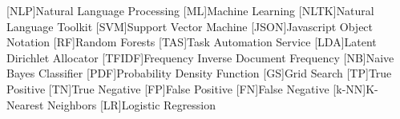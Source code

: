 \documentclass[a4paper,11pt,svgnames]{book}
\begin{document}
	[NLP]{Natural Language Processing}
	[ML]{Machine Learning}
	[NLTK]{Natural Language Toolkit}
	[SVM]{Support Vector Machine}
	[JSON]{Javascript Object Notation}
	[RF]{Random Forests}
	[TAS]{Task Automation Service}
	[LDA]{Latent Dirichlet Allocator}
	[TFIDF]{Frequency Inverse Document Frequency}
	[NB]{Naive Bayes Classifier}
	[PDF]{Probability Density Function}
	[GS]{Grid Search}
	[TP]{True Positive}
	[TN]{True Negative}
	[FP]{False Positive}
	[FN]{False Negative}
	[k-NN]{K-Nearest Neighbors}
	[LR]{Logistic Regression}
	\newcommand\litem[1]{\item{\bfseries #1 }}
	\renewcommand{\arraystretch}{1.5} %
	
	\newcommand\headcell[1]{%
	  \multicolumn{1}{|c|}{\cellcolor{DodgerBlue}\bfseries\sffamily\textcolor{white}{#1}}
	}
	
	
	
	
		
	
	
	
	
	
	
	
	
	\pagestyle{fancy}
	\fancyhf{}
	\fancyhead[RO]{\sffamily \slshape \rightmark}
	\fancyhead[LE]{\sffamily \slshape \leftmark}
	\fancyfoot[OR,EL]{\rmfamily \thepage} %
	
	
	
	
	
	
	
	
	
	
	
	\appendix
	
	\nocite{*}
	
	{
	\small
	
	}
	
\end{document}
